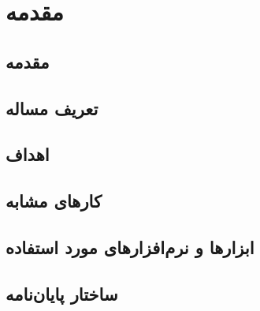 \chapter{مقدمه}
\section{مقدمه}

\section{تعریف مساله}
\section{اهداف}
\section{کار‌های مشابه}
\section{ابزار‌ها و نرم‌افزار‌های مورد استفاده}
\section{ساختار پایان‌نامه}